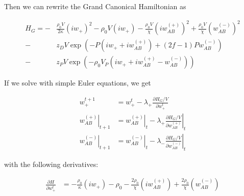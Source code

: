 \documentclass{article}
\begin{document}
Then we can rewrite the Grand Canonical Hamiltonian as

\begin{align*}
  H_G = - &\frac{\rho_0 V}{2\kappa} (i w_+)^2
        - \rho_0 V (i w_+)
        - \frac{\rho_0 V}{\chi} (i w_{AB}^{(+)})^2
        + \frac{\rho_0 V}{\chi} (w_{AB}^{(-)})^2 \\
        - &z_D V \exp(-P(iw_+ + iw_{AB}^{(+)}) + (2f-1)P w_{AB}^{(-)}) \\
        - &z_P V \exp(-\rho_0 V_P (iw_+ + iw_{AB}^{(+)} - w_{AB}^{(-)}))
\end{align*}

If we solve with simple Euler equations, we get

\begin{align*}
  w_+^{t+1} &= w_+^t - \lambda_+ \frac{\partial H_G/V}{\partial w_+^t} \\
  \left. w_{AB}^{(+)} \right|_{t+1} &= \left. w_{AB}^{(+)} \right|_t
    - \lambda_+ \left. \frac{\partial H_G/V}{\partial w_{AB}^{(+)}} \right|_t \\
  \left. w_{AB}^{(-)} \right|_{t+1} &= \left. w_{AB}^{(-)} \right|_t
    - \lambda_- \left. \frac{\partial H_G/V}{\partial w_{AB}^{(-)}} \right|_t
\end{align*}

with the following derivatives:

\begin{align*}
  \frac{\partial H}{\partial w_+^t} &=
  - \frac{\rho_0}{\kappa} (iw_+)
  - \rho_0
  - \frac{2 \rho_0}{\chi} (iw_{AB}^{(+)})
  + \frac{2 \rho_0}{\chi} (w_{AB}^{(-)})
\end{align*}
\end{document}
